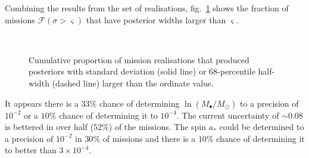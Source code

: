 \documentclass[useAMS,usedcolumn,usegraphicx,usenatbib]{mn2e}
\newcommand{\figref}[1]{fig.~\ref{fig:#1}}
\begin{document}
Combining the results from the set of realisations, \figref{Widths} shows the fraction of missions $\mathcal{F}(\sigma > \varsigma)$ that have posterior widths larger than $\varsigma$.
\begin{figure}
\begin{center}
    \quad 
    \\
    \quad
\caption{Cumulative proportion of mission realisations that produced posteriors with standard deviation (solid line) or $68$-percentile half-width (dashed line) larger than the ordinate value.\label{fig:Widths}}
  \end{center}
\end{figure}
It appears there is a $33\%$ chance of determining $\ln (M_\bullet/M_\odot)$ to a precision of $10^{-2}$ or a $10\%$ chance of determining it to $10^{-4}$. The current uncertainty of $\sim 0.08$ is bettered in over half ($52\%$) of the missions. The spin $a_\ast$ could be determined to a precision of $10^{-2}$ in $30\%$ of missions and there is a $10\%$ chance of determining it to better than $3\times 10^{-4}$.
\end{document}
